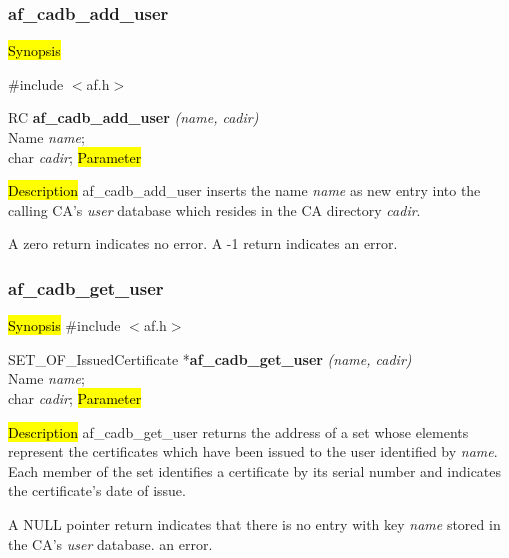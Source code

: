 \subsubsection{af\_cadb\_add\_user}
\label{af_cadb_add_user}

\hl{Synopsis}

\#include $<$af.h$>$

RC {\bf af\_cadb\_add\_user} {\em (name, cadir)} \\
Name {\em *name}; \\
char {\em *cadir};
\hl{Parameter}


\hl{Description}
af\_cadb\_add\_user inserts the name {\em name} as new entry into the calling CA's {\em user} 
database which resides in the CA directory {\em cadir}.

A  zero return indicates no error.
A -1 return indicates an error.



\subsubsection{af\_cadb\_get\_user}
\label{af_cadb_get_user}
\hl{Synopsis}
\#include $<$af.h$>$

SET\_OF\_IssuedCertificate *{\bf af\_cadb\_get\_user} {\em (name, cadir)} \\
Name {\em *name}; \\
char {\em *cadir};
\hl{Parameter}


\hl{Description}
af\_cadb\_get\_user returns the address of a set whose elements represent the certificates 
which have been issued to the user identified by {\em name}. Each member of the set identifies
a certificate by its serial number and indicates the certificate's date of issue.

A NULL pointer return indicates
\bi
\m that there is no entry with key {\em name} stored in the CA's {\em user} database.
\m an error.
\ei



